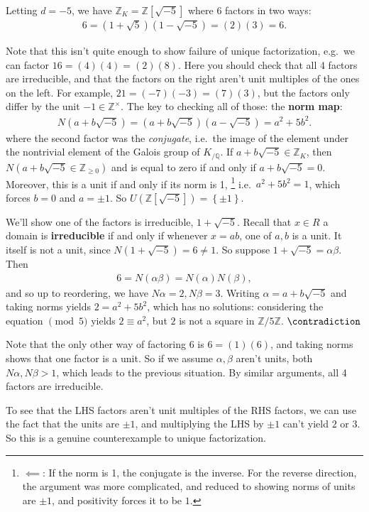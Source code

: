 \begin{example}

Letting \(d=-5\), we have \({\mathbb{Z}}_K = {\mathbb{Z}}[ \sqrt{-5} ]\)
where \(6\) factors in two ways:
\begin{align*}
6 = (1 + \sqrt{5} )(1 - \sqrt{-5} ) = (2)(3) = 6
.\end{align*}

Note that this isn't quite enough to show failure of unique
factorization, e.g.~we can factor \(16 = (4)(4) = (2)(8)\). Here you
should check that all 4 factors are irreducible, and that the factors on
the right aren't unit multiples of the ones on the left. For example,
\(21 = (-7)(-3) = (7)(3)\), but the factors only differ by the unit
\(-1\in {\mathbb{Z}}^{\times}\). The key to checking all of those: the
\textbf{norm map}:
\begin{align*}
N(a + b \sqrt{-5} ) = (a + b \sqrt{-5} ) (a - \sqrt{-5} ) = a^2 + 5b^2
.\end{align*}
where the second factor was the \emph{conjugate}, i.e.~the image of the
element under the nontrivial element of the Galois group of
\(K_{/{\mathbb{Q}}}\). If \(a + b \sqrt{-5} \in {\mathbb{Z}}_K\), then
\(N(a + b \sqrt{-5} \in {\mathbb{Z}}_{\geq 0})\) and is equal to zero if
and only if \(a + b \sqrt{-5} = 0\). Moreover, this is a unit if and
only if its norm is 1, \footnote{\(\impliedby\): If the norm is 1, the
  conjugate is the inverse. For the reverse direction, the argument was
  more complicated, and reduced to showing norms of units are \(\pm 1\),
  and positivity forces it to be \(1\).} i.e.~\(a^2 + 5b^2 = 1\), which
forces \(b=0\) and \(a=\pm 1\). So
\(U({\mathbb{Z}}[ \sqrt{-5} ] ) = \left\{{\pm 1}\right\}\).

We'll show one of the factors is irreducible, \(1 + \sqrt{-5}\). Recall
that \(x\in R\) a domain is \textbf{irreducible} if and only if whenever
\(x = ab\), one of \(a,b\) is a unit. It itself is not a unit, since
\(N(1 + \sqrt{-5 }) = 6 \neq 1\). So suppose
\(1 + \sqrt{-5} = \alpha \beta\). Then
\begin{align*}
6 = N(\alpha \beta ) = N( \alpha) N( \beta)
,\end{align*}
and so up to reordering, we have \(N \alpha = 2, N \beta= 3\). Writing
\(\alpha= a + b \sqrt{-5}\) and taking norms yields \(2 = a^2 + 5b^2\),
which has no solutions: considering the equation \(\pmod 5\) yields
\(2\equiv a^2\), but \(2\) is not a square in
\({\mathbb{Z}}/5{\mathbb{Z}}\). \(\contradiction\)

Note that the only other way of factoring \(6\) is \(6=(1)(6)\), and
taking norms shows that one factor is a unit. So if we assume
\(\alpha, \beta\) aren't units, both \(N \alpha, N \beta > 1\), which
leads to the previous situation. By similar arguments, all 4 factors are
irreducible.

To see that the LHS factors aren't unit multiples of the RHS factors, we
can use the fact that the units are \(\pm 1\), and multiplying the LHS
by \(\pm 1\) can't yield \(2\) or \(3\). So this is a genuine
counterexample to unique factorization.

\end{example}

